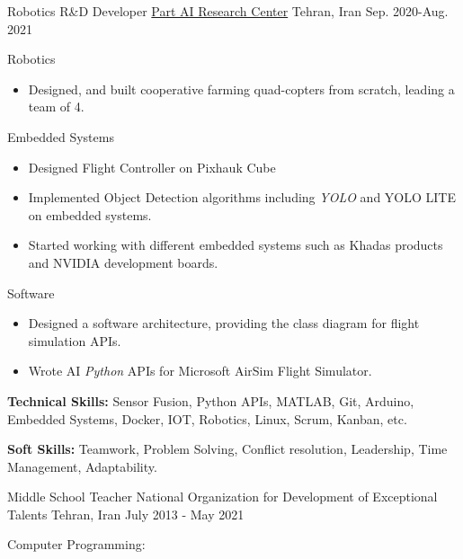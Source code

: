 \begin{cventries}
  
  \cventry
{Robotics R\&D Developer}  %
    {\href{https://ir.linkedin.com/company/partdp-ai}{Part AI Research Center}} %
    {Tehran, Iran} %
    {Sep. 2020-Aug. 2021} %
    {
      \begin{cvitems} %
                \item{Robotics}
        \begin{itemize}[label= - ]
            \item {Designed, and built cooperative farming quad-copters from scratch, leading a team of 4.}
        \end{itemize}
        \item{Embedded Systems}
        \begin{itemize}[label=-]
            \item {Designed Flight Controller on Pixhauk Cube}
            \item {Implemented Object Detection algorithms including \textit{YOLO} and YOLO LITE on embedded systems.}
            \item {Started working with different embedded systems such as Khadas products and NVIDIA development boards.}
        \end{itemize}
        \item{Software}
        \begin{itemize}[label = -]
        \item {Designed a software architecture, providing the class diagram for flight simulation APIs.}
            \item {Wrote AI \textit{Python} APIs for Microsoft AirSim Flight Simulator.}
        \end{itemize}
        \item {\textbf{Technical Skills:} Sensor Fusion, Python APIs, MATLAB, Git, Arduino, Embedded Systems, Docker, IOT, Robotics, Linux, Scrum, Kanban, etc.}
        \item {\textbf{Soft Skills:} Teamwork, Problem Solving, Conflict resolution, Leadership, Time Management, Adaptability.}
      \end{cvitems}
    } 
\cventry
    {Middle School Teacher}
    {National Organization for Development of Exceptional Talents}
    {Tehran, Iran}
    {July 2013 -  May 2021}
    {
      \begin{cvitems} %
        \item{Computer Programming:}

\end{cvitems}}
\end{cventries}
